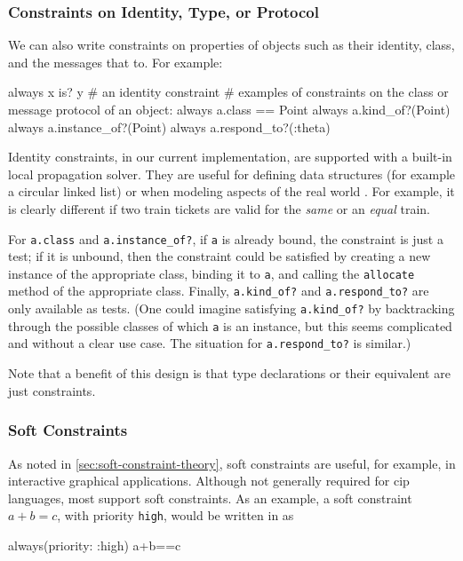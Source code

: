 \subsubsection{Constraints on Identity, Type, or Protocol}
We can also write constraints on properties of objects such as their
identity, class, and the messages that \DIFdelbegin {}\DIFdelend \DIFaddbegin {}\DIFaddend to.  For example:

\begin{code}
always { x is? y  } # an identity constraint
# examples of constraints on the class or message protocol of an object:
always { a.class == Point }
always { a.kind_of?(Point) }
always { a.instance_of?(Point) }
always { a.respond_to?(:theta) }
\end{code}

Identity constraints, in our current implementation, are supported
with a built-in local propagation solver. They are useful for defining
data structures (for example a circular linked list) or when modeling
aspects of the real world \cite{lopez-ecoop-1994}. For example, it is
clearly different if two train tickets are valid for the \emph{same}
or an \emph{equal} train.

For \lstinline{a.class} and \lstinline{a.instance_of?}, if
\lstinline{a} is already bound, the constraint is just a test; if it
is unbound, then the constraint could be satisfied by creating a new
instance of the appropriate class, binding it to \lstinline{a}, and
calling the \lstinline{allocate} method of the appropriate class.
Finally, \lstinline{a.kind_of?}  and \lstinline{a.respond_to?} are
only available as tests.  (One could imagine satisfying
\lstinline{a.kind_of?} by backtracking through the possible classes of
which \lstinline{a} is an instance, but this seems complicated and
without a clear use case.  The situation for \lstinline{a.respond_to?}
is similar.)

Note that a benefit of this design is that type declarations or
their equivalent are just constraints.

\subsubsection{Soft Constraints}
\label{sec:soft-constraints}
As noted in \autoref{sec:soft-constraint-theory}, soft constraints
are useful, for example, in interactive graphical
applications. Although not generally required for \ac{cip} languages,
most support soft constraints. As an example, a soft constraint
$a+b=c$, with priority \lstinline{high}, would be written in \toolname
as
\begin{code}[numbers=none]
always(priority: :high) {a+b==c}
\end{code}


